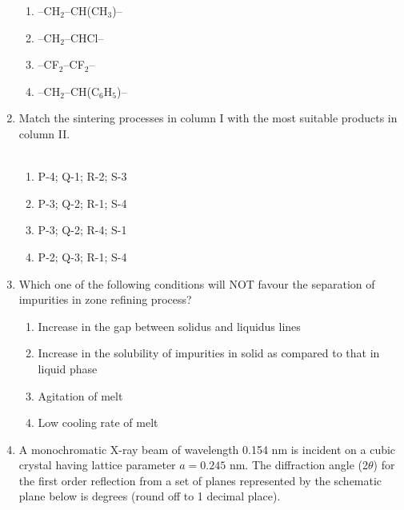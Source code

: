 \documentclass[journal,12pt,onecolumn]{IEEEtran}
\begin{document}
\begin{enumerate}[label=\arabic*)]
\vspace{0.2cm}
\begin{enumerate}[label=\alph*)]
\item --CH$_2$--CH(CH$_3$)--
\item --CH$_2$--CHCl--
\item --CF$_2$--CF$_2$--
\item --CH$_2$--CH(C$_6$H$_5$)--
\end{enumerate}

\newpage

\item Match the sintering processes in column I with the most suitable products in column II.\\



\vspace{0.2cm}
\hfill{} \\

\begin{enumerate}[label=\alph*)]
\item P-4; Q-1; R-2; S-3
\item P-3; Q-2; R-1; S-4
\item P-3; Q-2; R-4; S-1
\item P-2; Q-3; R-1; S-4
\end{enumerate}

\vspace{0.5cm}

\item Which one of the following conditions will NOT favour the separation of impurities in zone refining process?
\hfill{} \\

\vspace{0.2cm}
\begin{enumerate}[label=\alph*)]
\item Increase in the gap between solidus and liquidus lines
\item Increase in the solubility of impurities in solid as compared to that in liquid phase
\item Agitation of melt
\item Low cooling rate of melt
\end{enumerate}

\vspace{0.5cm}

\item A monochromatic X-ray beam of wavelength 0.154 nm is incident on a cubic crystal having lattice parameter $a=0.245$ nm. The diffraction angle (2$\theta$) for the first order reflection from a set of planes represented by the schematic plane below is \underline{\hspace{2cm}} degrees (round off to 1 decimal place).


\end{enumerate}
\end{document}
